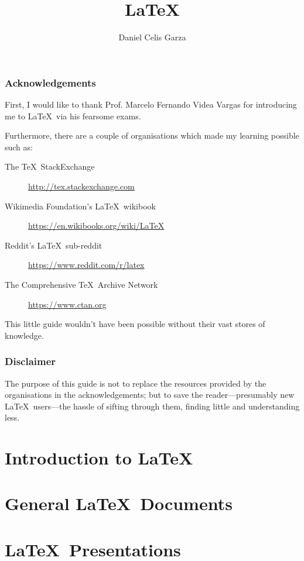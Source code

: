 \documentclass[12pt]{report}
\title{\LaTeX}[Quick-Start Guide]
\author{Daniel Celis Garza}
\begin{document}
\frontmatter
\maketitle

\section{Acknowledgements}
First, I would like to thank Prof. Marcelo Fernando Videa Vargas for
introducing me to \LaTeX~via his fearsome exams.

Furthermore, there are a couple of organisations which made my
learning possible such as:
\begin{description}
\item[The \TeX\ StackExchange]
  \url{http://tex.stackexchange.com}
\item[Wikimedia Foundation's \LaTeX~wikibook]
  \url{https://en.wikibooks.org/wiki/LaTeX}
\item[Reddit's \LaTeX~sub-reddit]
  \url{https://www.reddit.com/r/latex}
\item[The Comprehensive \TeX~Archive Network]
  \url{https://www.ctan.org}
\end{description}
This little guide wouldn't have been possible without their vast
stores of knowledge.

\section{Disclaimer}
The purpose of this guide is not to replace the resources provided by
the organisations in the acknowledgements; but to save the
reader---presumably new \LaTeX~users---the hassle of sifting through
them, finding little and understanding less.

\clearpage
\tableofcontents
\listoftables
\listoffigures

\mainmatter

\part{Introduction to \LaTeX}



\part{General \LaTeX~Documents}






\part{\LaTeX~Presentations}



\backmatter



\end{document}

